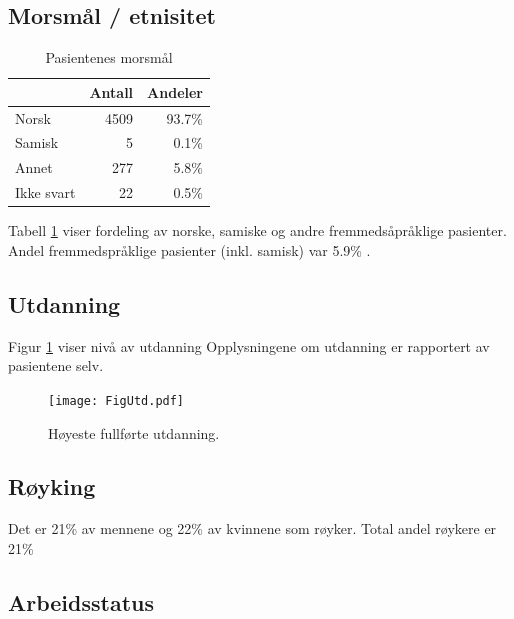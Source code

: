 \documentclass [norsk,a4paper,twoside]{article}\usepackage[]{graphicx}\usepackage[]{color}
\begin{document}
\subsection{Morsmål / etnisitet}

\begin{table}[ht]
\centering
\begin{tabular}{lrr}
  \hline
 & Antall & Andeler \\ 
  \hline
Norsk & 4509 & 93.7\% \\ 
  Samisk & 5 & 0.1\% \\ 
  Annet & 277 & 5.8\% \\ 
  Ikke svart & 22 & 0.5\% \\ 
   \hline
\end{tabular}
\caption{Pasientenes morsmål} 
\label{tab:Morsm}
\end{table}


Tabell \ref{tab:Morsm} viser fordeling av norske, samiske og andre fremmedsåpråklige pasienter.
Andel fremmedspråklige 
pasienter (inkl. samisk) var 5.9\% . 


\subsection{Utdanning}
Figur \ref{fig:Utd} viser nivå av utdanning 
Opplysningene om utdanning er rapportert av pasientene selv.



\begin{figure}[ht]
	\centering \texttt{[image: FigUtd.pdf]}
	\caption{\label{fig:Utd} Høyeste fullførte utdanning.}
\end{figure}


\subsection{Røyking}


Det er 21\% av mennene og 22\% av kvinnene som røyker. 
Total andel røykere er 21\%


\subsection{Arbeidsstatus}
\end{document}
